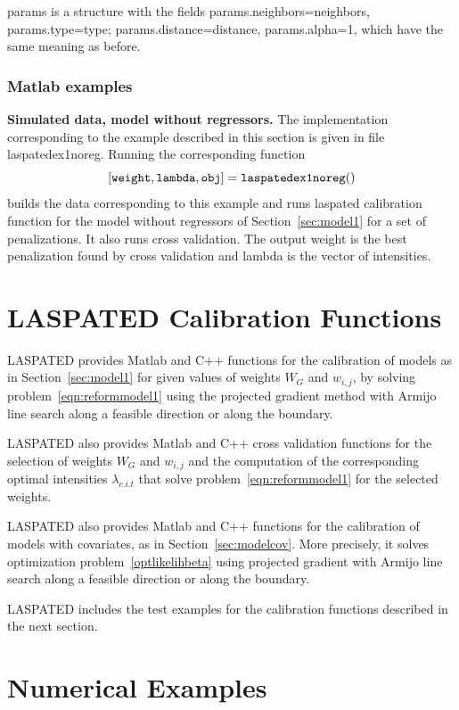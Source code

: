 \documentclass[article]{jss}
\begin{document}
{params is a structure
with the fields
params.neighbors=neighbors, params.type=type; params.distance=distance,
params.alpha=1, which have the same meaning as before.


\subsubsection{Matlab examples}

\par {\textbf{Simulated data, model without regressors.}} The implementation corresponding to the example 
described in this section is  given in file laspatedex1noreg.
Running the corresponding function
$$
{\tt{[weight,lambda,obj]=laspatedex1noreg()}}
$$
builds the data corresponding to this example and runs laspated calibration function for the model without regressors of Section~\ref{sec:model1} for a set of penalizations.
It also runs cross validation.
The output weight is the best penalization found by cross validation and lambda is the vector of intensities.
}

\section{LASPATED Calibration Functions}
\label{sec:calib}

LASPATED provides Matlab and C++ functions for the calibration of models as in Section~\ref{sec:model1} for given values of weights $W_{G}$ and $w_{i,j}$, by solving
problem~\eqref{eqn:reformmodel1} using the projected gradient method with Armijo line search along a feasible direction or along the boundary.

LASPATED also provides Matlab and C++ cross validation functions for the selection of weights $W_{G}$ and $w_{i,j}$ and the computation of the corresponding optimal intensities
$\lambda_{c.i.t}$ that solve problem~\eqref{eqn:reformmodel1}
for the selected weights.

LASPATED also provides Matlab and C++ functions for the
calibration of models with covariates, as in  Section~\ref{sec:modelcov}.
More precisely, it solves optimization problem~\eqref{optlikelihbeta} using projected gradient with Armijo line search along a feasible direction or along the boundary.

LASPATED includes the test examples for the calibration functions described in the next section.


\section{Numerical Examples}
\label{sec:examples}
\end{document}
